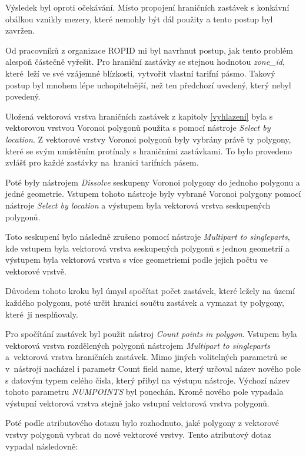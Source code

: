 Výsledek byl oproti očekávání. Místo propojení hraničních zastávek s konkávní obálkou vznikly mezery, 
které nemohly být dál použity a tento postup byl zavržen.

Od pracovníků z organizace ROPID mi byl navrhnut postup, jak tento problém alespoň částečně vyřešit. Pro hraniční zastávky se stejnou hodnotou \textit{zone\_id}, 
které~leží ve své vzájemné blízkosti, vytvořit vlastní tarifní pásmo. Takový postup byl mnohem lépe uchopitelnější, než ten předchozí uvedený, který nebyl povedený.

Uložená vektorová vrstva hraničních zastávek z kapitoly \ref{vyhlazeni} byla s vektorovou vrstvou Voronoi polygonů
použita s pomocí nástroje \textit{Select by location}. Z vektorové vrstvy Voronoi polygonů byly vybrány právě ty polygony,
které se svým umístěním protínaly s hraničními zastávkami. To bylo provedeno zvlášť pro každé zastávky na~hranici tarifních pásem.

Poté byly nástrojem \textit{Dissolve} seskupeny Voronoi polygony do jednoho polygonu a jedné geometrie. Vstupem tohoto nástroje byly
vybrané Voronoi polygony pomocí nástroje \textit{Select by location} a výstupem byla vektorová vrstva seskupených polygonů.

Toto seskupení bylo následně zrušeno pomocí nástroje \textit{Multipart to singleparts}, kde vstupem byla vektorová vrstva 
seskupených polygonů s jednou geometrií a vý\-stupem byla vektorová vrstva s více geometriemi podle jejich počtu ve vektorové vrstvě.

Důvodem tohoto kroku byl úmysl spočítat počet zastávek, které ležely na území každého polygonu, poté určit hranici
součtu zastávek a vymazat ty polygony, které~ji nesplňovaly.

Pro spočítání zastávek byl použit nástroj \textit{Count points in polygon}. Vstupem byla vektorová vrstva 
rozdělených polygonů nástrojem \textit{Multipart to singleparts}
a~vektorová vrstva hraničních zastávek. Mimo jiných volitelných parametrů se v~nástroji nacházel i parametr 
Count field name, který určoval název nového pole s datovým typem celého čísla,
který přibyl na výstupu nástroje. Výchozí název tohoto paramet\-ru \textit{NUMPOINTS} byl ponechán. 
Kromě nového pole vypadala vý\-stupní vektorová vrstva stejně jako vstupní vektorová vrstva polygonů.

Poté podle atributového dotazu bylo rozhodnuto, jaké polygony z vektorové vrstvy polygonů vybrat do nové vektorové vrstvy.
Tento atributový dotaz vypadal následovně: 

